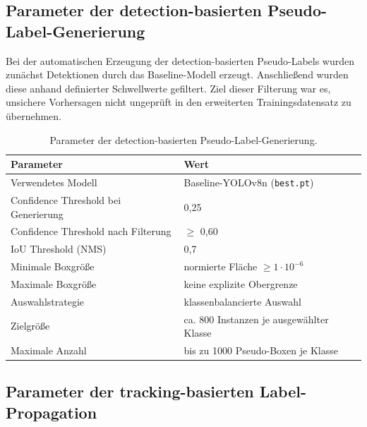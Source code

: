 \subsection{Parameter der detection-basierten Pseudo-Label-Generierung}

Bei der automatischen Erzeugung der detection-basierten Pseudo-Labels wurden
zunächst Detektionen durch das Baseline-Modell erzeugt. Anschließend wurden
diese anhand definierter Schwellwerte gefiltert. Ziel dieser Filterung war es,
unsichere Vorhersagen nicht ungeprüft in den erweiterten Trainingsdatensatz zu
übernehmen.

\begin{table}[H]
    \centering
    \caption{Parameter der detection-basierten Pseudo-Label-Generierung.}
    \label{tab:anhang_pseudo_params}
    \begin{tabular}{ll}
        \toprule
        \textbf{Parameter}                   & \textbf{Wert}                            \\
        \midrule
        Verwendetes Modell                   & Baseline-YOLOv8n (\texttt{best.pt})      \\
        Confidence Threshold bei Generierung & 0{,}25                                   \\
        Confidence Threshold nach Filterung  & $\geq$ 0{,}60                            \\
        IoU Threshold (NMS)                  & 0{,}7                                    \\
        Minimale Boxgröße                    & normierte Fläche $\geq 1\cdot10^{-6}$    \\
        Maximale Boxgröße                    & keine explizite Obergrenze               \\
        Auswahlstrategie                     & klassenbalancierte Auswahl               \\
        Zielgröße                            & ca. 800 Instanzen je ausgewählter Klasse \\
        Maximale Anzahl                      & bis zu 1000 Pseudo-Boxen je Klasse       \\
        \bottomrule
    \end{tabular}
\end{table}

\subsection{Parameter der tracking-basierten Label-Propagation}

